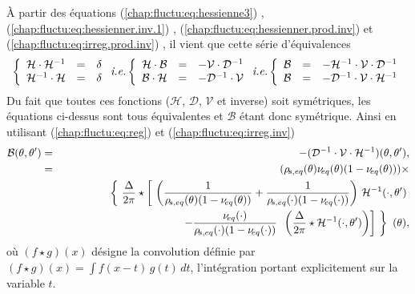 \medskip

À partir des équations (\ref{chap:fluctu:eq:hessienne3}) , (\ref{chap:fluctu:eq:hessienner.inv.1}) , (\ref{chap:fluctu:eq:hessienner.prod.inv}) et (\ref{chap:fluctu:eq:irreg.prod.inv}) , il vient que cette série d'équivalences
\begin{eqnarray*}
	\left \{\begin{array}{rcl} \mathcal{H}\cdot\mathcal{H}^{-1} & =& \delta \\  \mathcal{H}^{-1}\cdot \mathcal{H}& =& \delta  \end{array} \right.  \mbox{\emph{i.e.}}	 \left \{\begin{array}{rcl} \mathcal{H}\cdot\mathcal{B} & =& - \mathcal{V}\cdot\mathcal{D}^{-1} \\  \mathcal{B}\cdot\mathcal{H} & =& - \mathcal{D}^{-1}\cdot\mathcal{V}  \end{array} \right. \mbox{\emph{i.e.}} \left \{\begin{array}{rcl} \mathcal{B} & =& - \mathcal{H}^{-1}\cdot\mathcal{V}\cdot \mathcal{D}^{-1}  \\  \mathcal{B} & =& - \mathcal{D}^{-1}\cdot\mathcal{V}\cdot \mathcal{H}^{-1}  \end{array} \right.
\end{eqnarray*}
Du fait que toutes ces fonctions ($\mathcal{H}$, $\mathcal{D}$, $\mathcal{V}$ et inverse) soit symétriques, les équations ci-dessus sont tous équivalentes et $\mathcal{B}$ étant donc symétrique.
Ainsi en utilisant (\ref{chap:fluctu:eq:reg}) et (\ref{chap:fluctu:eq:irreg.inv})
\begin{eqnarray}
	\mathcal{B}(\theta , \theta ' )  & = & - (\mathcal{D}^{-1}\cdot\mathcal{V}\cdot \mathcal{H}^{-1})(\theta , \theta') 	, \label{chap:fluctu:eq:B.1}\\
	& = & 	 (\rho_{\! s , eq}(\theta) \nu_{\! eq}(\theta) (1 -  \nu_{\! eq}(\theta) )) \times  \notag\\
	&&  ~~~~~~~~~~~~~\left \{  \frac{\Delta}{2\pi} \star  \left [ \left (  \frac{1}{\rho_{\! s, eq}(\theta)  (1 - \nu_{\! eq}(\theta)  )} +  \frac{1}{\rho_{\! s, eq}(\cdot) (1 - \nu_{\! eq} (\cdot )  )}\right )  \, \mathcal{H}^{-1}( \cdot , \theta ' )   \right. \right .\notag\\
	 &&  ~~~~~~~~~~~~~~~~~~~~~~~~~\left . \left .   -  \frac{\nu_{\! eq}(\cdot)}{\rho_{\! s, eq}(\cdot) ( 1 - \nu_{\! eq}(\cdot) )}  \, \left ( \frac{\Delta}{2\pi} \star \mathcal{H}^{-1}( \cdot , \theta ' )   \right )  \right ] \right \} (\theta)   \notag,
\end{eqnarray}
où \( (f \star g)(x) \) désigne la convolution définie par \( (f \star g)(x) = \int f(x - t)\, g(t)\, dt \), l'intégration portant explicitement sur la variable \( t \).
